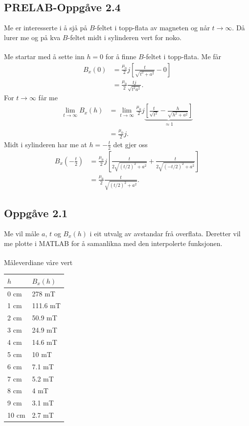 \documentclass[11pt, a4paper]{article}
\begin{document}
  \subsection*{PRELAB-Oppgåve 2.4}
    Me er interesserte i å sjå på $B$-feltet i topp-flata av magneten og når $t \to \infty$. Då lurer me og på kva $B$-feltet midt i sylinderen vert for noko. \\ \\
    Me startar med å sette inn $h = 0$ for å finne $B$-feltet i topp-flata. Me får
    \begin{align*}
      B_x(0) &= \frac{\mu_0}{2}j\left[ \frac{t}{\sqrt{t^2 + a^2}} - 0 \right] \\
      &= \frac{\mu_0}{2}\frac{tj}{\sqrt{t^2 a^2}}.
    \end{align*}
    For $t \to \infty$ får me
    \begin{align*}
      \lim_{t \to \infty} B_x(h) &= \lim_{t \to \infty} \frac{\mu_0}{2}j\underbrace{\left[ \frac{t}{\sqrt{t^2}} - \frac{h}{\sqrt{h^2 + a^2}} \right]}_{\approx 1} \\
      &= \frac{\mu_0}{2}j.
    \end{align*}
    Midt i sylinderen har me at $h = -\frac{t}{2}$ det gjer oss
    \begin{align*}
      B_x(-\frac{t}{2}) &= \frac{\mu_0}{2}j\left[ \frac{t}{2\sqrt{(t/2)^2 + a^2}} + \frac{t}{2\sqrt{(-t/2)^2 + a^2}} \right] \\
      &= \frac{\mu_0}{2}\frac{t}{\sqrt{(t/2)^2 + a^2}}.
    \end{align*}



  \subsection*{Oppgåve 2.1}
    Me vil måle $a$, $t$ og $B_{x}(h)$ i eit utvalg av avstandar frå overflata. Deretter vil me plotte i MATLAB for å samanlikna med den interpolerte funksjonen. \\ \\
    Måleverdiane våre vert
    \begin{center}
      \begin{tabular}{|l|l|}
        \hline
        $h$ & $B_{x}(h)$ \\
        \hline
        0 cm & 278 mT \\
        1 cm & 111.6 mT \\
        2 cm & 50.9 mT \\
        3 cm & 24.9 mT \\
        4 cm & 14.6 mT \\
        5 cm & 10 mT \\
        6 cm & 7.1 mT \\
        7 cm & 5.2 mT \\
        8 cm & 4 mT \\
        9 cm & 3.1 mT \\
        10 cm & 2.7 mT \\
        \hline
      \end{tabular}
    \end{center}
\end{document}
